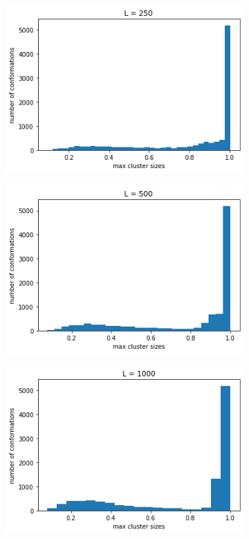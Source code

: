 \begin{figure}[H]
	\centering
	\begin{subfigure}[t]{0.3\textwidth} 
		\includegraphics[width=\textwidth]{../images/max_cluster_size_L250.png} 
	\end{subfigure}
	\begin{subfigure}[t]{0.3\textwidth} 
		\includegraphics[width=\textwidth]{../images/max_cluster_size_L500.png} 
	\end{subfigure}
	\begin{subfigure}[t]{0.3\textwidth} 
		\includegraphics[width=\textwidth]{../images/max_cluster_size_L1000.png} 

\end{subfigure}
\end{figure}
